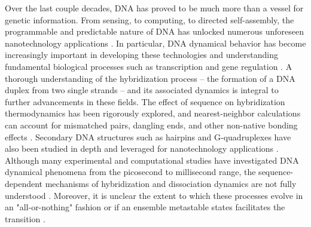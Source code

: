 \documentclass[journal=jpcbfk,manuscript=article]{achemso}
\begin{document}
Over the last couple decades, DNA has proved to be much more than a vessel for genetic information. From sensing, to computing, to directed self-assembly, the programmable and predictable nature of DNA has unlocked numerous unforeseen nanotechnology applications \citep{Seeman2017DNANanotechnology, Adleman1994MolecularProblems, Rothemund2006FoldingPatterns, Gu2010ALine}. In particular, DNA dynamical behavior has become increasingly important in developing these technologies and understanding fundamental biological processes such as transcription and gene regulation \citep{Deluca2020DynamicDevices, Cordes2010SensingTransfer, Naimark2020DNADevelopment}. A thorough understanding of the hybridization process -- the formation of a DNA duplex from two single strands -- and its associated dynamics is integral to further advancements in these fields. The effect of sequence on hybridization thermodynamics has been rigorously explored, and nearest-neighbor calculations can account for mismatched pairs, dangling ends, and other non-native bonding effects \citep{SantaLucia1998AThermodynamics, Santalucia2004TM}. Secondary DNA structures such as hairpins and G-quadruplexes have also been studied in depth and leveraged for nanotechnology applications \citep{Tsukanov2013DetailedOrigami, Mosayebi2014TheFormation, Mergny2019DNANanotechnology}. Although many experimental and computational studies have investigated DNA dynamical phenomena from the picosecond to millisecond range, the sequence-dependent mechanisms of hybridization and dissociation dynamics are not fully understood \citep{Yin2011KineticsHybridization, Xiao2019, Hinckley2014Coarse-grainedEffects, Sanstead2016, Porschke1971CooperativeTransition, Porschke1973ThermodynamicsPairs, Chen2007InfluenceHybridization, Craig1971ElaxationOligon}. Moreover, it is unclear the extent to which these processes evolve in an "all-or-nothing" fashion or if an ensemble metastable states facilitates the transition \citep{Araque2016LatticeCooperativity, Sikora2013ModelingIntermediates}.
\end{document}
